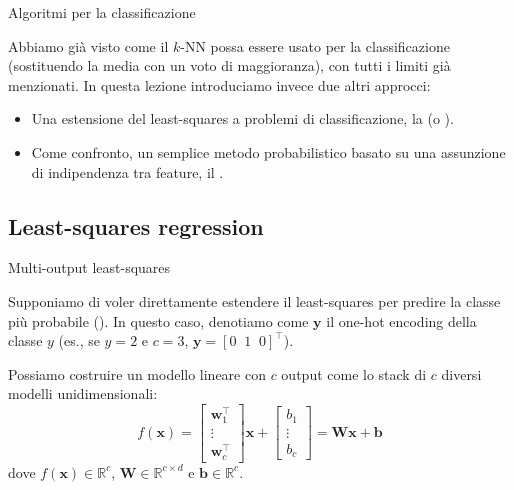 \documentclass[12pt,aspectratio=169]{beamer}
\begin{document}
\begin{frame}{Algoritmi per la classificazione}

	Abbiamo già visto come il $k$-NN possa essere usato per la classificazione (sostituendo la media con un voto di maggioranza), con tutti i limiti già menzionati. In questa lezione introduciamo invece due altri approcci:
	\begin{itemize}
		\item Una estensione del least-squares a problemi di classificazione, la  (o ).
		\item Come confronto, un semplice metodo probabilistico basato su una assunzione di indipendenza tra feature, il .
	\end{itemize}

\end{frame}

\subsection{Least-squares regression}

\begin{frame}{Multi-output least-squares}

	Supponiamo di voler direttamente estendere il least-squares per predire la classe più probabile (). In questo caso, denotiamo come $\mathbf{y}$ il one-hot encoding della classe $y$ (es., se $y=2$ e $c=3$, $\mathbf{y}=[0 \;\; 1 \;\; 0]^\top$).

	Possiamo costruire un modello lineare con $c$ output come lo stack di $c$ diversi modelli unidimensionali:
	\begin{equation}
		f(\mathbf{x}) = \begin{bmatrix} \mathbf{w}_1^\top \\ \vdots \\ \mathbf{w}_c^\top\end{bmatrix}\mathbf{x} + \begin{bmatrix} b_1 \\ \vdots \\ b_c \end{bmatrix} =
		\mathbf{W}\mathbf{x} + \mathbf{b}
	\end{equation}
	dove $f(\mathbf{x}) \in \mathbb{R}^c$, $\mathbf{W} \in \mathbb{R}^{c \times d}$ e $\mathbf{b} \in \mathbb{R}^c$.

\end{frame}
\end{document}
